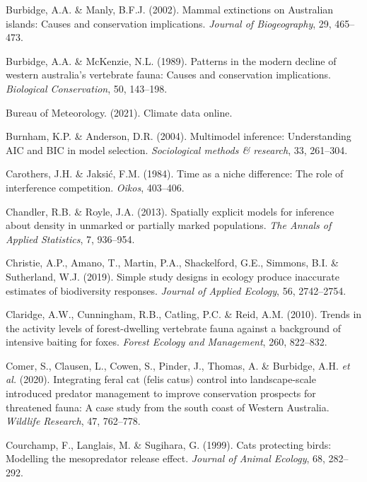 \documentclass[11pt,a4paper,titlepage,twoside,openright]{style/unimelbthesis}
\begin{document}
\begin{mainmatter}
\leavevmode\hypertarget{ref-burbidge2002mammal}{}%
Burbidge, A.A. \& Manly, B.F.J. (2002). Mammal extinctions on Australian islands: Causes and conservation implications. \emph{Journal of Biogeography}, 29, 465--473.

\leavevmode\hypertarget{ref-burbidge1989patterns}{}%
Burbidge, A.A. \& McKenzie, N.L. (1989). Patterns in the modern decline of western australia's vertebrate fauna: Causes and conservation implications. \emph{Biological Conservation}, 50, 143--198.

\leavevmode\hypertarget{ref-BOM2021}{}%
Bureau of Meteorology. (2021). Climate data online.

\leavevmode\hypertarget{ref-burnham2004multimodel}{}%
Burnham, K.P. \& Anderson, D.R. (2004). Multimodel inference: Understanding AIC and BIC in model selection. \emph{Sociological methods \& research}, 33, 261--304.

\leavevmode\hypertarget{ref-carothers1984time}{}%
Carothers, J.H. \& Jaksić, F.M. (1984). Time as a niche difference: The role of interference competition. \emph{Oikos}, 403--406.

\leavevmode\hypertarget{ref-chandler2013spatially}{}%
Chandler, R.B. \& Royle, J.A. (2013). Spatially explicit models for inference about density in unmarked or partially marked populations. \emph{The Annals of Applied Statistics}, 7, 936--954.

\leavevmode\hypertarget{ref-christie2019simple}{}%
Christie, A.P., Amano, T., Martin, P.A., Shackelford, G.E., Simmons, B.I. \& Sutherland, W.J. (2019). Simple study designs in ecology produce inaccurate estimates of biodiversity responses. \emph{Journal of Applied Ecology}, 56, 2742--2754.

\leavevmode\hypertarget{ref-claridge2010trends}{}%
Claridge, A.W., Cunningham, R.B., Catling, P.C. \& Reid, A.M. (2010). Trends in the activity levels of forest-dwelling vertebrate fauna against a background of intensive baiting for foxes. \emph{Forest Ecology and Management}, 260, 822--832.

\leavevmode\hypertarget{ref-comer2020integrating}{}%
Comer, S., Clausen, L., Cowen, S., Pinder, J., Thomas, A. \& Burbidge, A.H. \emph{et al.} (2020). Integrating feral cat (felis catus) control into landscape-scale introduced predator management to improve conservation prospects for threatened fauna: A case study from the south coast of Western Australia. \emph{Wildlife Research}, 47, 762--778.

\leavevmode\hypertarget{ref-courchamp1999cats}{}%
Courchamp, F., Langlais, M. \& Sugihara, G. (1999). Cats protecting birds: Modelling the mesopredator release effect. \emph{Journal of Animal Ecology}, 68, 282--292.


\end{mainmatter}
\end{document}
